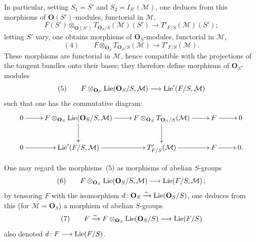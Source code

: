 In particular, setting \(S_{1}=S'\) and \(S_{2}=I_{S'}(\mathcal{M})\), one
deduces from this morphisms of \(\mathbf{O}(S')\)-modules, functorial in
\(\mathcal{M}\),
\[
F(S')\otimes_{\mathbf{O}(S')}T_{\mathbf{O}_{S}/S}(\mathcal{M})(S')
\longrightarrow
T'_{F/S}(\mathcal{M})(S');
\]
letting \(S'\) vary, one obtains morphisms of \(\mathbf{O}_{S}\)-modules,
functorial in \(\mathcal{M}\),
\[
(4)\qquad
F\otimes_{\mathbf{O}_{S}}T_{\mathbf{O}_{S}/S}(\mathcal{M})
\longrightarrow
T'_{F/S}(\mathcal{M}).
\]
These morphisms are functorial in \(\mathcal{M}\), hence compatible with the
projections of the tangent bundles onto their bases; they therefore define
morphisms of \(\mathbf{O}_{S}\)-modules
\[
(5)\qquad
F\otimes_{\mathbf{O}_{S}}\operatorname{Lie}(\mathbf{O}_{S}/S,\mathcal{M})
\longrightarrow
\operatorname{Lie}'(F/S,\mathcal{M})
\]
such that one has the commutative diagram:
\[
\xymatrix{
0 \ar[r]
&
F\otimes_{\mathbf{O}_{S}}\Lie(\mathbf{O}_{S}/S,\mathcal{M}) \ar[r] \ar[d]
&
F\otimes_{\mathbf{O}_{S}}T_{\mathbf{O}_{S}/S}(\mathcal{M}) \ar[r] \ar[d]
&
F \ar[r]
&
0
\\
0 \ar[r]
&
\Lie'(F/S,\mathcal{M}) \ar[r]
&
T'_{F/S}(\mathcal{M}) \ar[r]
&
F \ar[r]
&
0.
}
\]

One may regard the morphisms~(5) as morphisms of abelian \(S\)-groups
\[
(6)\qquad
F\otimes_{\mathbf{O}_{S}}\operatorname{Lie}(\mathbf{O}_{S}/S,\mathcal{M})
\longrightarrow
\operatorname{Lie}(F/S,\mathcal{M})\,;
\]
by tensoring \(F\) with the isomorphism
\(d\colon\mathbf{O}_{S}\xrightarrow{\sim}\operatorname{Lie}(\mathbf{O}_{S}/S)\), one deduces from this
(for \(\mathcal{M}=\mathbf{O}_{S}\)) a morphism of abelian \(S\)-groups
\[
(7)\qquad
F\xrightarrow{\sim} F\otimes_{\mathbf{O}_{S}}\operatorname{Lie}(\mathbf{O}_{S}/S)
\longrightarrow
\operatorname{Lie}(F/S)
\]
also denoted \(d\colon F\longrightarrow\operatorname{Lie}(F/S)\).

